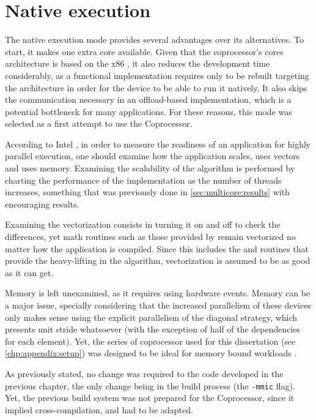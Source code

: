 \documentclass[../thesis]{subfiles}
\begin{document}
	\section{Native execution}
	\label{sec:mic:native}

	The native execution mode provides several advantages over its alternatives. To start, it makes one extra core available. Given that the coprocessor's cores architecture is based on the x86 \isa, it also reduces the development time considerably, as a \cpu functional implementation requires only to be rebuilt targeting the \mic architecture in order for the device to be able to run it natively. It also skips the communication necessary in an offload-based implementation, which is a potential bottleneck for many applications. For these reasons, this mode was selected as a first attempt to use the \intel\xeonphi Coprocessor.

	According to Intel \cite{Intel:MIC:Overview}, in order to measure the readiness of an application for highly parallel execution, one should examine how the application scales, uses vectors and uses memory. Examining the scalability of the algorithm is performed by charting the performance of the implementation as the number of threads increases, something that was previously done in \cref{sec:multicore:results} with encouraging results.

	Examining the vectorization consists in turning it on and off to check the differences, yet math routines such as those provided by \intel\mkl remain vectorized no matter how the application is compiled. Since this includes the \blas and \lapack routines that provide the heavy-lifting in the algorithm, vectorization is assumed to be as good as it can get.

	Memory is left unexamined, as it requires using hardware events. Memory can be a major issue, specially considering that the increased parallelism of these devices only makes sense using the explicit parallelism of the diagonal strategy, which presents unit stride whatsoever (with the exception of half of the dependencies for each element). Yet, the series of \intel\xeonphi coprocessor used for this dissertation (see \cref{chp:appendix:setup}) was designed to be ideal for memory bound workloads \cite{Intel:MIC:Discovery}.

	As previously stated, no change was required to the code developed in the previous chapter, the only change being in the build process (the \texttt{-mmic} flag). Yet, the previous build system was not prepared for the \intel\xeonphi Coprocessor, since it implied cross-compilation, and had to be adapted.

	
\end{document}
